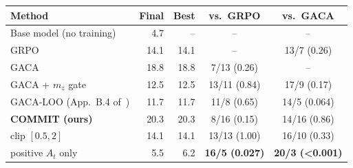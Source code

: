 \begin{tabular}{@{}lrrcc@{}}
\toprule
Method & Final & Best & vs.\ GRPO & vs.\ GACA \\
\midrule
Base model (no training) & 4.7 & -- & -- & -- \\
GRPO~\cite{shao2024deepseekmath} & 14.1 & 14.1 & -- & 13/7 (0.26) \\
GACA~\cite{liang2026gaca} & 18.8 & 18.8 & 7/13 (0.26) & -- \\
\midrule
GACA + $m_z$ gate & 12.5 & 12.5 & 13/11 (0.84) & 17/9 (0.17) \\
GACA-LOO (App.~B.4 of~\cite{liang2026gaca}) & 11.7 & 11.7 & 11/8 (0.65) & 14/5 (0.064) \\
\textbf{COMMIT (ours)} & 20.3 & 20.3 & 8/16 (0.15) & 14/16 (0.86) \\
\quad clip $[0.5, 2]$ & 14.1 & 14.1 & 13/13 (1.00) & 16/10 (0.33) \\
\quad positive $A_t$ only & 5.5 & 6.2 & \textbf{16/5 (0.027)} & \textbf{20/3 (<0.001)} \\
\bottomrule
\end{tabular}
